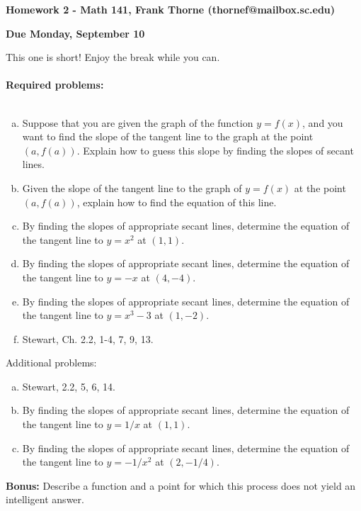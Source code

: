 \documentclass[12pt]{article}
\begin{document}
\setlength{\topmargin}{-2mm}





\begin{center}{\bf Homework 2 - Math 141, Frank Thorne (thornef@mailbox.sc.edu)}
\end{center}
\begin{center}
{\bf Due Monday, September 10}
\end{center}

This one is short! Enjoy the break while you can.
\\
\\
{\bf Required problems:}
\\
\\
\begin{enumerate}[(a)]
\item
Suppose that you are given the graph of the function $y = f(x)$, and
you want to find the slope of the tangent line to the graph at the point
$(a, f(a))$. Explain how to guess this slope by
finding the slopes of secant lines.

\item
Given the slope of the tangent line to the graph of $y = f(x)$ at the point
$(a, f(a))$, explain how to find the equation of this line.

\item
By finding the slopes of appropriate secant lines, determine the equation
of the tangent line to $y = x^2$ at $(1, 1)$.

\item
By finding the slopes of appropriate secant lines, determine the equation
of the tangent line to $y = -x$ at $(4, -4)$.

\item
By finding the slopes of appropriate secant lines, determine the equation
of the tangent line to $y = x^3 - 3$ at $(1, -2)$.

\item
Stewart, Ch. 2.2, 1-4, 7, 9, 13.

\end{enumerate}

Additional problems:

\begin{enumerate}[(a)]
\item
Stewart, 2.2, 5, 6, 14.

\item
By finding the slopes of appropriate secant lines, determine the equation
of the tangent line to $y = 1/x$ at $(1, 1)$.

\item
By finding the slopes of appropriate secant lines, determine the equation
of the tangent line to $y = -1/x^2$ at $(2, -1/4)$.
\end{enumerate}
{\bf Bonus:} Describe a function and a point for which this process does not yield an
intelligent answer.
\end{document}
